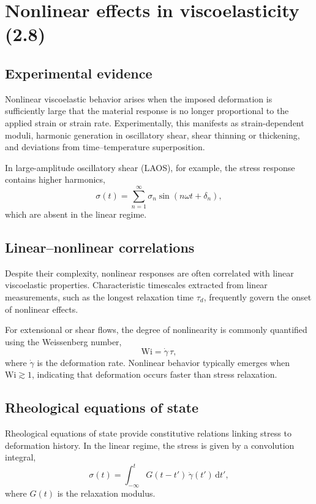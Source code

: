\section{Nonlinear effects in viscoelasticity (2.8)}

\subsection{Experimental evidence}

Nonlinear viscoelastic behavior arises when the imposed deformation is sufficiently large that the material response is no longer proportional to the applied strain or strain rate. Experimentally, this manifests as strain-dependent moduli, harmonic generation in oscillatory shear, shear thinning or thickening, and deviations from time--temperature superposition.

In large-amplitude oscillatory shear (LAOS), for example, the stress response contains higher harmonics,
\begin{equation}
\sigma(t) = \sum_{n=1}^{\infty} \sigma_n \sin(n\omega t + \delta_n),
\end{equation}
which are absent in the linear regime.

\subsection{Linear--nonlinear correlations}

Despite their complexity, nonlinear responses are often correlated with linear viscoelastic properties. Characteristic timescales extracted from linear measurements, such as the longest relaxation time $\tau_d$, frequently govern the onset of nonlinear effects.

For extensional or shear flows, the degree of nonlinearity is commonly quantified using the Weissenberg number,
\begin{equation}
\mathrm{Wi} = \dot\gamma\,\tau,
\end{equation}
where $\dot\gamma$ is the deformation rate. Nonlinear behavior typically emerges when $\mathrm{Wi} \gtrsim 1$, indicating that deformation occurs faster than stress relaxation.

\subsection{Rheological equations of state}

Rheological equations of state provide constitutive relations linking stress to deformation history. In the linear regime, the stress is given by a convolution integral,
\begin{equation}
\sigma(t) = \int_{-\infty}^{t} G(t-t')\,\dot\gamma(t')\,\mathrm{d}t',
\end{equation}
where $G(t)$ is the relaxation modulus.

